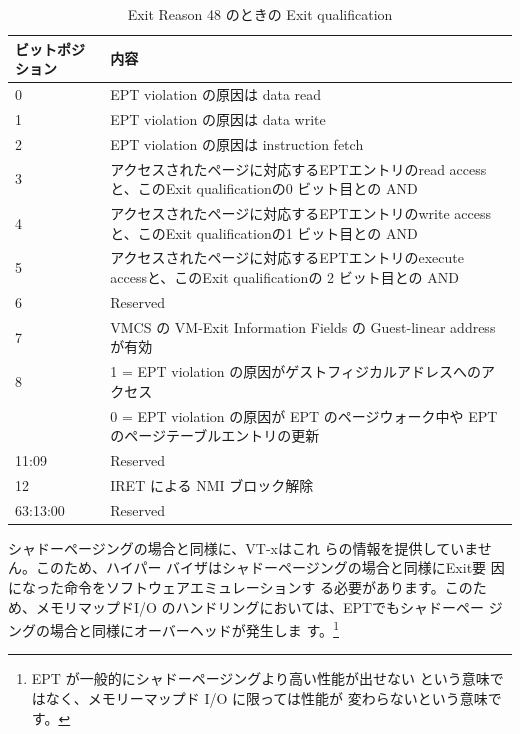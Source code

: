 \begin{table}\centering
\begin{tabular}{|p{3.2cm}|p{13cm}|} \hline

ビットポジション & 内容 \\
\hline
0	& EPT violation の原因は data read \\
\hline

1	& EPT violation の原因は data write \\
\hline

2	& EPT violation の原因は instruction fetch \\
\hline

3 & アクセスされたページに対応するEPTエントリのread accessと、このExit qualificationの0 ビット目との AND \\
\hline

4 & アクセスされたページに対応するEPTエントリのwrite accessと、このExit qualificationの1 ビット目との AND \\
\hline

5 & アクセスされたページに対応するEPTエントリのexecute accessと、このExit qualificationの 2 ビット目との AND \\
\hline

6 & Reserved \\
\hline

7 & VMCS の VM-Exit Information Fields の Guest-linear address が有効 \\
\hline

8 & 1 = EPT violation の原因がゲストフィジカルアドレスへのアクセス \\
	& 0 = EPT violation の原因が EPT のページウォーク中や EPT のページテーブルエントリの更新  \\
\hline


11:09 & Reserved \\
\hline

12 & IRET による NMI ブロック解除 \\
\hline

63:13:00 & Reserved \\
\hline



\end{tabular}
\caption{Exit Reason 48 のときの Exit qualification}
\label{tab3}

\end{table}

 シャドーページングの場合と同様に、VT-xはこれ
らの情報を提供していません。このため、ハイパー
バイザはシャドーページングの場合と同様にExit要
因になった命令をソフトウェアエミュレーションす
る必要があります。このため、メモリマップドI/O
のハンドリングにおいては、EPTでもシャドーペー
ジングの場合と同様にオーバーヘッドが発生しま
す。\footnote{
EPT が一般的にシャドーページングより高い性能が出せない
という意味ではなく、メモリーマップド I/O に限っては性能が
変わらないという意味です。
}

